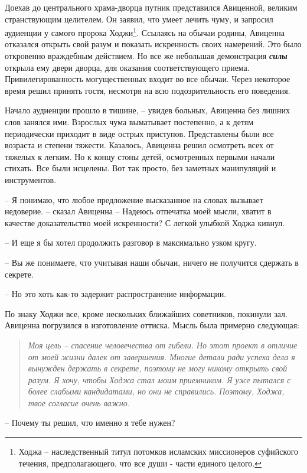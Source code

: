 \documentclass[12pt,a4paper]{article}
\begin{document}
Доехав до центрального храма-дворца путник представился Авиценной, великим странствующим целителем. Он заявил, что умеет лечить чуму, и запросил аудиенции у самого пророка Ходжи\footnote{Ходжа -- наследственный титул потомков исламских миссионеров суфийского течения, предполагающего, что все души - части единого целого.}. Ссылаясь на обычаи родины, Авиценна отказался открыть свой разум и показать искренность своих намерений. Это было откровенно враждебным действием. Но все же небольшая демонстрация \textbf{\textit{силы}} открыла ему двери дворца, для оказания соответствующего приема. Привилегированность могущественных входит во все обычаи. Через некоторое время решил принять гостя, несмотря на всю подозрительность его поведения.

Начало аудиенции прошло в тишине, -- увидев больных, Авиценна без лишних слов занялся ими. Взрослых чума выматывает постепенно, а к детям периодически приходит в виде острых приступов. Представлены были все возраста и степени тяжести. Казалось, Авиценна решил осмотреть всех от тяжелых к легким. Но к концу стоны детей, осмотренных первыми начали стихать. Все были исцелены. Вот так просто, без заметных манипуляций и инструментов.

-- Я понимаю, что любое предложение высказанное на словах вызывает недоверие. -- сказал Авиценна -- Надеюсь отпечатка моей мысли, хватит в качестве доказательство моей искренности?
С легкой улыбкой Ходжа кивнул.

-- И еще я бы хотел продолжить разговор в максимально узком кругу.

-- Вы же понимаете, что учитывая наши обычаи, ничего не получится сдержать в секрете.

-- Но это хоть как-то задержит распространение информации.

По знаку Ходжи все, кроме нескольких ближайших советников, покинули зал. Авиценна погрузился в изготовление оттиска. Мысль была примерно следующая:

\begin{quotation}
	\textit{Моя цель -- спасение человечества от гибели. Но этот проект в отличие от моей жизни далек от завершения. Многие детали ради успеха дела я вынужден держать в секрете, поэтому не могу никому открыть свой разум. Я хочу, чтобы Ходжа стал моим приемником. Я уже пытался с более слабыми кандидатами, но они не справились. Поэтому, Ходжа, твое согласие очень важно.}
\end{quotation}

-- Почему ты решил, что именно я тебе нужен?
\end{document}
